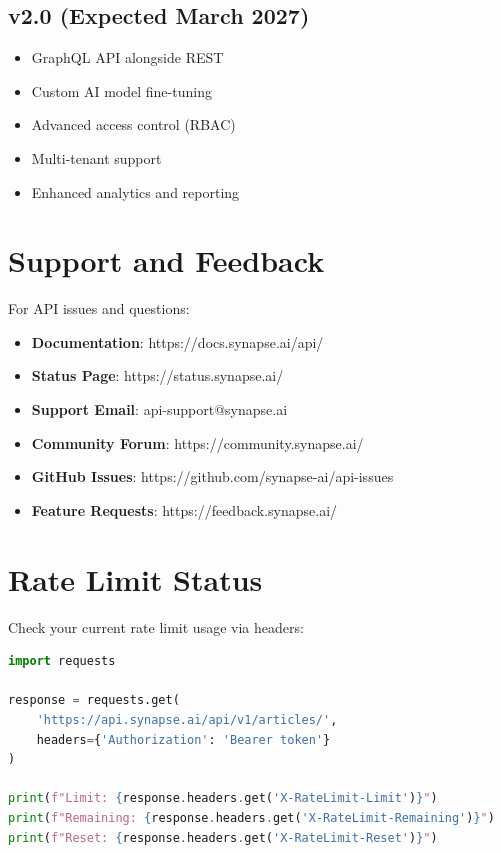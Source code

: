\documentclass{report}
\begin{document}
\subsection{v2.0 (Expected March 2027)}

\begin{itemize}
    \item GraphQL API alongside REST
    \item Custom AI model fine-tuning
    \item Advanced access control (RBAC)
    \item Multi-tenant support
    \item Enhanced analytics and reporting
\end{itemize}

\section{Support and Feedback}

For API issues and questions:

\begin{itemize}
    \item \textbf{Documentation}: https://docs.synapse.ai/api/
    \item \textbf{Status Page}: https://status.synapse.ai/
    \item \textbf{Support Email}: api-support@synapse.ai
    \item \textbf{Community Forum}: https://community.synapse.ai/
    \item \textbf{GitHub Issues}: https://github.com/synapse-ai/api-issues
    \item \textbf{Feature Requests}: https://feedback.synapse.ai/
\end{itemize}

\section{Rate Limit Status}

Check your current rate limit usage via headers:

\begin{lstlisting}[language=Python]
import requests

response = requests.get(
    'https://api.synapse.ai/api/v1/articles/',
    headers={'Authorization': 'Bearer token'}
)

print(f"Limit: {response.headers.get('X-RateLimit-Limit')}")
print(f"Remaining: {response.headers.get('X-RateLimit-Remaining')}")
print(f"Reset: {response.headers.get('X-RateLimit-Reset')}")
\end{lstlisting}
\end{document}
